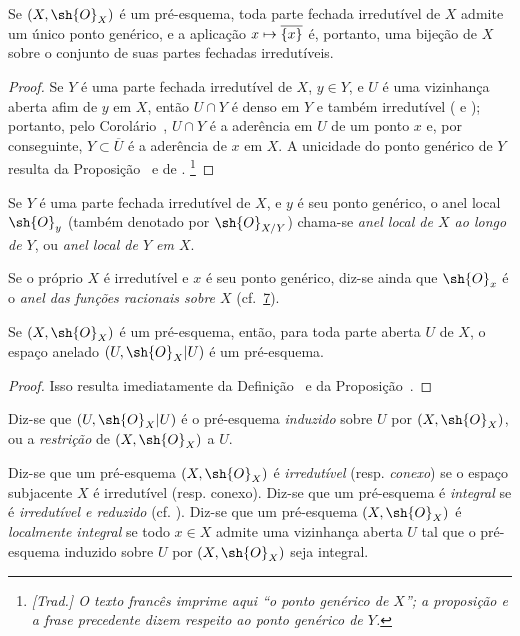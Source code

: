 \documentclass[oneside]{amsart}
\makeatletter
\newcommand{\ega@arrow}[2]{\mathchoice{#1}{#2}{#2}{#2}}
\let\ega@shortmapsto\mapsto
\renewcommand{\mapsto}{\ega@arrow{\longmapsto}{\ega@shortmapsto}}
\let\EGAOriginalLabel\label
\renewcommand{\label}[1]{\phantomsection\EGAOriginalLabel{#1}}
\makeatother
\begin{document}
\begin{proposition}[2.1.5]
\label{I.2.1.5}
Se $(X,\sh{O}_X)$ é um pré-esquema, toda parte fechada irredutível
de $X$ admite um único ponto genérico, e a aplicação
$x\mapsto\overline{\{x\}}$ é, portanto, uma bijeção de $X$ sobre o
conjunto de suas partes fechadas irredutíveis.
\end{proposition}

\begin{proof}
Se $Y$ é uma parte fechada irredutível de $X$, $y\in Y$, e $U$ é uma
vizinhança aberta afim de $y$ em $X$, então $U\cap Y$ é denso em $Y$
e também irredutível ( e );
portanto, pelo Corolário~, $U\cap Y$ é a aderência em
$U$ de um ponto $x$ e, por conseguinte, $Y\subset\overline{U}$ é a
aderência de $x$ em $X$. A unicidade do ponto genérico de $Y$ resulta
da Proposição~ e de .
\footnote{\emph{[Trad.] O texto francês imprime aqui ``o ponto
genérico de $X$''; a proposição e a frase precedente dizem respeito
ao ponto genérico de $Y$.}}
\end{proof}

\begin{env}[2.1.6]
\label{I.2.1.6}
Se $Y$ é uma parte fechada irredutível de $X$, e $y$ é seu ponto
genérico, o anel local $\sh{O}_y$ (também denotado por
$\sh{O}_{X/Y}$) chama-se \emph{anel local de $X$ ao longo de $Y$},
ou \emph{anel local de $Y$ em $X$}.

Se o próprio $X$ é irredutível e $x$ é seu ponto genérico, diz-se
ainda que $\sh{O}_x$ é o \emph{anel das funções racionais sobre $X$}
(cf.~\textsection\hyperref[section:I.7]{7}).
\end{env}

\begin{proposition}[2.1.7]
\label{I.2.1.7}
Se $(X,\sh{O}_X)$ é um pré-esquema, então, para toda parte aberta
$U$ de $X$, o espaço anelado $(U,\sh{O}_X|U)$ é um pré-esquema.
\end{proposition}

\begin{proof}
Isso resulta imediatamente da Definição~ e da
Proposição~.
\end{proof}

Diz-se que $(U,\sh{O}_X|U)$ é o pré-esquema \emph{induzido} sobre
$U$ por $(X,\sh{O}_X)$, ou a \emph{restrição} de
$(X,\sh{O}_X)$ a $U$.

\begin{env}[2.1.8]
\label{I.2.1.8}
Diz-se que um pré-esquema $(X,\sh{O}_X)$ é \emph{irredutível}
(resp. \emph{conexo}) se o espaço subjacente $X$ é irredutível
(resp. conexo). Diz-se que um pré-esquema é \emph{integral} se é
\emph{irredutível e reduzido} (cf. ). Diz-se que um
pré-esquema $(X,\sh{O}_X)$ é \emph{localmente integral} se todo
$x\in X$ admite uma vizinhança aberta $U$ tal que o pré-esquema
induzido sobre $U$ por $(X,\sh{O}_X)$ seja integral.
\end{env}
\end{document}
